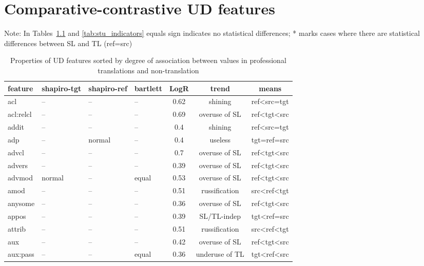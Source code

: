 \chapter{\label{appx:feat_analysis}Comparative-contrastive UD features}

Note: In Tables~\ref{tab:pro_indicators} and \ref{tab:stu_indicators} equals sign indicates no statistical differences; * marks cases where there are statistical differences between SL and TL (ref=src)

\begin{longtable}{l|p{2cm}p{2cm}p{1.5cm}ccc}
	\caption{\label{tab:pro_indicators}Properties of UD features sorted by degree of association between values in professional translations and non-translation}\\
	\toprule
	feature       & shapiro-tgt & shapiro-ref & bartlett & LogR & trend          & means \\
	\midrule
	acl           & -- & --   & --  & 0.62    & shining        & ref\textless{}src=tgt \\
	acl:relcl     & -- & --   & --  & 0.69    & overuse of SL & ref\textless{}tgt\textless{}src \\
	addit         & -- & --  & --   & 0.4     & shining   & ref\textless{}src=tgt \\
	adp           & -- & normal& --& 0.4  & useless   & tgt=ref=src   \\
	advcl         & -- & --   & --  & 0.7 & overuse of SL  & ref\textless{}tgt\textless{}src \\
	advers        & -- & --  & --   & 0.39 & overuse of SL  & ref\textless{}tgt\textless{}src \\
	advmod        & normal       & --  & equal& 0.53 & overuse of SL  & ref\textless{}tgt\textless{}src \\
	amod          & -- & --  & -- & 0.51    & russification  & src\textless{}ref\textless{}tgt \\
	anysome       & -- & --  & -- & 0.36    & overuse of SL  & ref\textless{}tgt\textless{}src \\
	appos         & -- & --  & -- & 0.39    & SL/TL-indep    & tgt\textless{}ref=src           \\
	attrib        & -- & --  & -- & 0.51    & russification  & src\textless{}ref\textless{}tgt \\
	aux           & -- & --  & -- & 0.42    & overuse of SL  & ref\textless{}tgt\textless{}src \\
	aux:pass      & -- & --  & equal & 0.36 & underuse of TL  & tgt\textless{}ref\textless{}src \\

\end{longtable}

